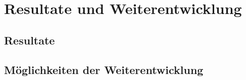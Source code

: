 
\section{Resultate und Weiterentwicklung}
\label{Resultate und Weiterentwicklung}


\subsection{Resultate}
\label{Resultate und Weiterentwicklung:Resultate}


\subsection{Möglichkeiten der Weiterentwicklung}
\label{Resultate und Weiterentwicklung:Möglichkeiten der Weiterentwicklung}

